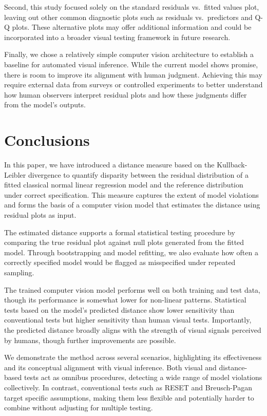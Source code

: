 \documentclass[]{interact}
\theoremstyle{plain}%
\theoremstyle{definition}
\theoremstyle{remark}
\begin{document}
Second, this study focused solely on the standard residuals vs.~fitted
values plot, leaving out other common diagnostic plots such as residuals
vs.~predictors and Q-Q plots. These alternative plots may offer
additional information and could be incorporated into a broader visual
testing framework in future research.

Finally, we chose a relatively simple computer vision architecture to
establish a baseline for automated visual inference. While the current
model shows promise, there is room to improve its alignment with human
judgment. Achieving this may require external data from surveys or
controlled experiments to better understand how human observers
interpret residual plots and how these judgments differ from the model's
outputs.

\section{Conclusions}\label{conclusions}

In this paper, we have introduced a distance measure based on the
Kullback-Leibler divergence to quantify disparity between the residual
distribution of a fitted classical normal linear regression model and
the reference distribution under correct specification. This measure
captures the extent of model violations and forms the basis of a
computer vision model that estimates the distance using residual plots
as input.

The estimated distance supports a formal statistical testing procedure
by comparing the true residual plot against null plots generated from
the fitted model. Through bootstrapping and model refitting, we also
evaluate how often a correctly specified model would be flagged as
misspecified under repeated sampling.

The trained computer vision model performs well on both training and
test data, though its performance is somewhat lower for non-linear
patterns. Statistical tests based on the model's predicted distance show
lower sensitivity than conventional tests but higher sensitivity than
human visual tests. Importantly, the predicted distance broadly aligns
with the strength of visual signals perceived by humans, though further
improvements are possible.

We demonstrate the method across several scenarios, highlighting its
effectiveness and its conceptual alignment with visual inference. Both
visual and distance-based tests act as omnibus procedures, detecting a
wide range of model violations collectively. In contrast, conventional
tests such as RESET and Breusch-Pagan target specific assumptions,
making them less flexible and potentially harder to combine without
adjusting for multiple testing.
\end{document}
